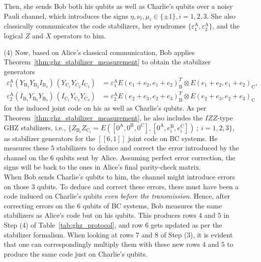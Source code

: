 \documentclass[journal,onecolumn]{IEEEtran}
\newcommand{\llbr}{[\![}
\newcommand{\rrbr}{]\!]}
\begin{document}
\begin{enumerate}
Then, she sends Bob both his qubits as well as Charlie's qubits over a noisy Pauli channel, which introduces the signs $\eta, \nu_i, \mu_i \in \{ \pm 1 \}, i = 1,2,3$.
She also classically communicates the code stabilizers, her syndromes $\{\varepsilon_1^{\text{A}}, \varepsilon_2^{\text{A}}\}$, and the logical $Z$ and $X$ operators to him. \\


\item[(4)] Now, based on Alice's classical communication, Bob applies Theorem~\ref{thm:ghz_stabilizer_measurement} to obtain the stabilizer generators
\begin{align*}
\varepsilon_1^{\text{A}} (Y_{\text{B}_1} Y_{\text{B}_2} I_{\text{B}_3}) \, (Y_{\text{C}_1} Y_{\text{C}_2} I_{\text{C}_3}) & = \varepsilon_1^{\text{A}} E(e_1+e_2,e_1+e_2)_{\text{B}}^T \otimes E(e_1+e_2,e_1+e_2)_{\text{C}} , \\ 
%
\varepsilon_2^{\text{A}} (I_{\text{B}_1} Y_{\text{B}_2} Y_{\text{B}_3}) \, (I_{\text{C}_1} Y_{\text{C}_2} Y_{\text{C}_3}) & = \varepsilon_2^{\text{A}} E(e_2+e_3,e_2+e_3)_{\text{B}}^T \otimes E(e_2+e_3,e_2+e_3)_{\text{C}}
\end{align*}
for the induced joint code on his as well as Charlie's qubits.
As per Theorem~\ref{thm:ghz_stabilizer_measurement}, he also includes the $IZZ$-type GHZ stabilizers, i.e., $\{ Z_{\text{B}_i} Z_{\text{C}_i} = E([0^{\text{A}},0^{\text{B}},0^{\text{C}}],[0^{\text{A}},e_i^{\text{B}},e_i^{\text{C}}]) \ ; \ i = 1,2,3 \}$, as stabilizer generators for the $\llbr 6,1 \rrbr$ joint code on BC systems.
He measures these $5$ stabilizers to deduce and correct the error introduced by the channel on the $6$ qubits sent by Alice.
Assuming perfect error correction, the signs will be back to the ones in Alice's final parity-check matrix. \\

When Bob sends Charlie's qubits to him, the channel might introduce errors on those $3$ qubits.
To deduce and correct these errors, there must have been a code induced on Charlie's qubits \emph{even before the transmission}.
Hence, after correcting errors on the $6$ qubits of BC systems, Bob measures the same stabilizers as Alice's code but on his qubits.
This produces rows $4$ and $5$ in Step (4) of Table~\ref{tab:ghz_protocol}, and row $6$ gets updated as per the stabilizer formalism.
When looking at rows $7$ and $8$ of Step (3), it is evident that one can correspondingly multiply them with these new rows $4$ and $5$ to produce the same code just on Charlie's qubits. \\


\end{enumerate}
\end{document}
